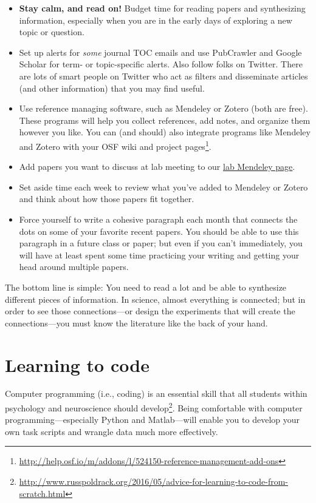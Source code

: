 \documentclass[letterpaper,12pt,oneside]{memoir}
\begin{document}
{\begin{itemize}
\item \textbf{Stay calm, and read on!} Budget time for reading papers and synthesizing information, especially when you are in the early days of exploring a new topic or question. 
\item Set up alerts for \textit{some} journal TOC emails and use PubCrawler and Google Scholar for term- or topic-specific alerts. Also follow folks on Twitter. There are lots of smart people on Twitter who act as filters and disseminate articles (and other information) that you may find useful.
\item Use reference managing software, such as Mendeley or Zotero (both are free). These programs will help you collect references, add notes, and organize them however you like. You can (and should) also integrate programs like Mendeley and Zotero with your OSF wiki and project pages\footnote{\url{http://help.osf.io/m/addons/l/524150-reference-management-add-ons}}.
\item Add papers you want to discuss at lab meeting to our \href{https://www.mendeley.com/community/smith-lab-meetings/}{lab Mendeley page}. 
\item Set aside time each week to review what you've added to Mendeley or Zotero and think about how those papers fit together.
\item Force yourself to write a cohesive paragraph each month that connects the dots on some of your favorite recent papers. You should be able to use this paragraph in a future class or paper; but even if you can't immediately, you will have at least spent some time practicing your writing and getting your head around multiple papers.
\end{itemize}

\begin{shaded}
\noindent The bottom line is simple: You need to read a lot and be able to synthesize different pieces of information. In science, almost everything is connected; but in order to see those connections---or design the experiments that will create the connections---you must know the literature like the back of your hand.
\end{shaded}


\section{Learning to code}
\label{sec:coding}

Computer programming (i.e., coding) is an essential skill that all students within psychology and neuroscience should develop\footnote{\url{http://www.russpoldrack.org/2016/05/advice-for-learning-to-code-from-scratch.html}}. Being comfortable with computer programming---especially Python and Matlab---will enable you to develop your own task scripts and wrangle data much more effectively. 

}
\end{document}
